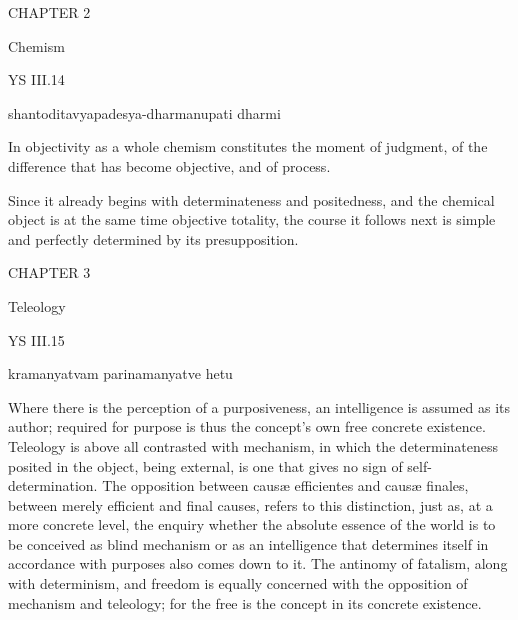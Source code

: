 CHAPTER 2

Chemism

YS III.14

    shantoditavyapadesya-dharmanupati dharmi

In objectivity as a whole
chemism constitutes the moment of judgment,
of the difference that has become objective,
and of process.

Since it already begins with
determinateness and positedness,
and the chemical object is
at the same time objective totality,
the course it follows next is
simple and perfectly determined
by its presupposition.

CHAPTER 3

Teleology

YS III.15

    kramanyatvam parinamanyatve hetu

Where there is the perception of a purposiveness,
an intelligence is assumed as its author;
required for purpose is thus the concept's
own free concrete existence.
Teleology is above all contrasted with mechanism,
in which the determinateness posited in the object,
being external, is one that gives no sign of self-determination.
The opposition between causæ efficientes and causæ finales,
between merely efficient and final causes,
refers to this distinction, just as,
at a more concrete level, the enquiry whether the absolute essence
of the world is to be conceived as blind mechanism
or as an intelligence that determines itself
in accordance with purposes also comes down to it.
The antinomy of fatalism, along with determinism,
and freedom is equally concerned with
the opposition of mechanism and teleology;
for the free is the concept in its concrete existence.

